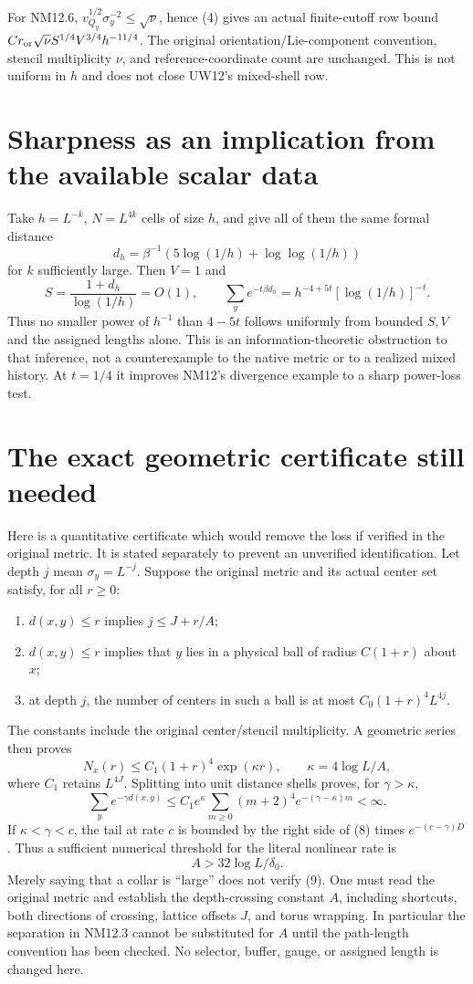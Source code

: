 \documentclass{article}
\begin{document}
For NM12.6, $v_{Q_y}^{1/2}\sigma_y^{-2}\leq\sqrt\nu$, hence (4) gives an actual finite-cutoff row bound $C r_{\rm or}\sqrt\nu S^{1/4}V^{3/4}h^{-11/4}$. The original orientation/Lie-component convention, stencil multiplicity $\nu$, and reference-coordinate count are unchanged. This is not uniform in $h$ and does not close UW12's mixed-shell row.

\section{Sharpness as an implication from the available scalar data}
Take $h=L^{-k}$, $N=L^{4k}$ cells of size $h$, and give all of them the same formal distance
\[
 d_h=\beta^{-1}\left(5\log(1/h)+\log\log(1/h)\right)
\]
for $k$ sufficiently large. Then $V=1$ and
\[
 S=\frac{1+d_h}{\log(1/h)}=O(1),\qquad
 \sum_y e^{-t\beta d_h}=h^{-4+5t}[\log(1/h)]^{-t}.
 \tag{6}
\]
Thus no smaller power of $h^{-1}$ than $4-5t$ follows uniformly from bounded $S,V$ and the assigned lengths alone. This is an information-theoretic obstruction to that inference, not a counterexample to the native metric or to a realized mixed history. At $t=1/4$ it improves NM12's divergence example to a sharp power-loss test.

\section{The exact geometric certificate still needed}
Here is a quantitative certificate which would remove the loss if verified in the original metric. It is stated separately to prevent an unverified identification. Let depth $j$ mean $\sigma_y=L^{-j}$. Suppose the original metric and its actual center set satisfy, for all $r\geq0$:
\begin{enumerate}
\item $d(x,y)\leq r$ implies $j\leq J+r/A$;
\item $d(x,y)\leq r$ implies that $y$ lies in a physical ball of radius $C(1+r)$ about $x$;
\item at depth $j$, the number of centers in such a ball is at most $C_0(1+r)^4L^{4j}$.
\end{enumerate}
The constants include the original center/stencil multiplicity. A geometric series then proves
\[
 N_x(r)\leq C_1(1+r)^4\exp(\kappa r),\qquad
 \kappa=4\log L/A,
 \tag{7}
\]
where $C_1$ retains $L^{4J}$. Splitting into unit distance shells proves, for $\gamma>\kappa$,
\[
 \sum_y e^{-\gamma d(x,y)}\leq
 C_1 e^\kappa\sum_{m\geq0}(m+2)^4e^{-(\gamma-\kappa)m}<\infty.
 \tag{8}
\]
If $\kappa<\gamma<c$, the tail at rate $c$ is bounded by the right side of (8) times $e^{-(c-\gamma)D}$. Thus a sufficient numerical threshold for the literal nonlinear rate is
\[
 A>32\log L/\delta_0.
 \tag{9}
\]
Merely saying that a collar is ``large'' does not verify (9). One must read the original metric and establish the depth-crossing constant $A$, including shortcuts, both directions of crossing, lattice offsets $J$, and torus wrapping. In particular the separation in NM12.3 cannot be substituted for $A$ until the path-length convention has been checked. No selector, buffer, gauge, or assigned length is changed here.
\end{document}
